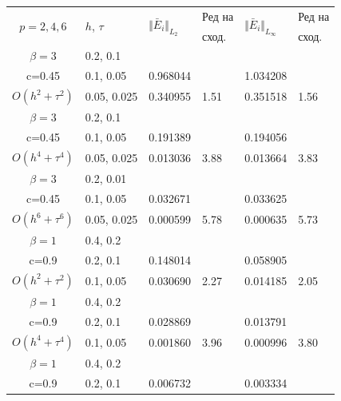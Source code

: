 \documentclass[a4paper]{article}
\theoremstyle{remark}
\begin{document}
\begin{large}
\begin{table}[ht]
\begin{tabular}{||c|l|ll|ll||}
      \multirow{2  }{*}{$p=2,4,6$}        & \multirow{2  }{*}{$h$, $\tau$}  &	\multirow{2  }{*}{  $\Vert \bar E_i \Vert_{L_2} $ } 	&Ред на & \multirow{2  }{*}{  $\Vert \bar E_i \Vert_{L_\infty}$ }	&Ред на   \\
	                                        &                                                &    										&  сход. & 										& сход. \\
\hline 
\hline 
  $\beta=3$               &0.2, 0.1      &              	&           &                	&      \\
   c=0.45                   &0.1, 0.05    &0.968044  	&           &1.034208   &       \\
 $O(h^2 + \tau^ 2)$ 	&0.05, 0.025	& 0.340955 	& 1.51    &0.351518  	&  1.56      \\
\hline 
  $\beta=3$               &0.2, 0.1      &              	&          	&                 &      \\
   c=0.45                   &0.1, 0.05    &0.191389 	&          	&0.194056   	&       \\
$O(h^4+ \tau^4)$	&0.05, 0.025	&0.013036 	& 3.88   	&0.013664   	& 3.83       \\
\hline 
  $\beta=3$               &0.2, 0.01    &                	&          	&                 &      \\
     c=0.45                 &0.1, 0.05    &0.032671 	&          	& 0.033625  	&       \\
  $O(h^6+ \tau^6)$ 	&0.05, 0.025	&0.000599 	&5.78    	& 0.000635  	& 5.73       \\
\hline
\hline 
       $\beta=1$        	&0.4, 0.2      &             	&            &           &   \\
           c=0.9    		&0.2, 0.1      &  0.148014 	&            &0.058905 &   \\
  $O(h^2+ \tau^2)$  	&0.1, 0.05   	& 0.030690  	&2.27  	 &0.014185   & 2.05 \\
\hline
      $\beta=1$           &0.4, 0.2    	&            	&               &             &    \\
       c=0.9                 &0.2, 0.1     & 0.028869   &        &  0.013791   &   \\
 $O(h^4+ \tau^4)$ 	&0.1, 0.05   	&0.001860 	& 3.96  & 0.000996  & 3.80  \\
\hline
  $\beta=1$     		&0.4, 0.2   	&            	&          	&                  &      \\
      c=0.9                  &0.2, 0.1   	&0.006732 	&            & 0.003334      &       \\

\end{tabular}
\end{table}
\end{large}
\end{document}
